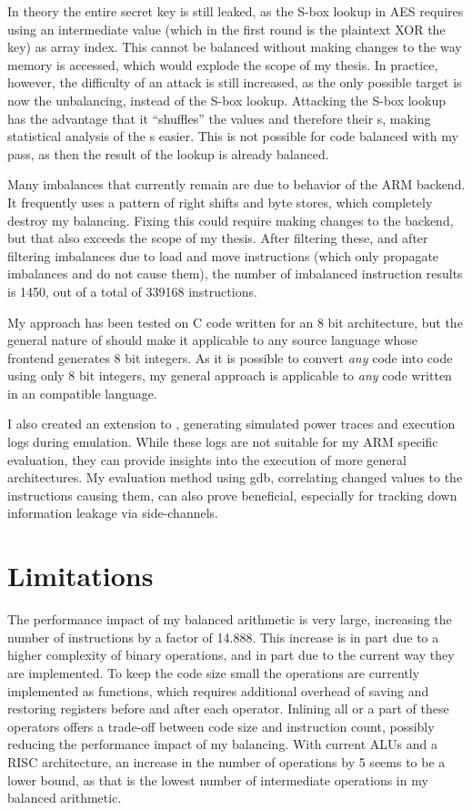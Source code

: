In theory the entire secret key is still leaked, as the S-box lookup in AES requires using an intermediate value (which in the first round is the plaintext XOR the key) as array index.
This cannot be balanced without making changes to the way memory is accessed, which would explode the scope of my thesis.
In practice, however, the difficulty of an attack is still increased, as the only possible target is now the unbalancing, instead of the S-box lookup.
Attacking the S-box lookup has the advantage that it ``shuffles'' the values and therefore their \hammingw{}s, making statistical analysis of the \hammingw{}s easier.
This is not possible for code balanced with my pass, as then the result of the lookup is already balanced.

Many imbalances that currently remain are due to behavior of the \llvm{} ARM backend.
It frequently uses a pattern of right shifts and byte stores, which completely destroy my balancing.
Fixing this could require making changes to the backend, but that also exceeds the scope of my thesis.
After filtering these, and after filtering imbalances due to load and move instructions (which only propagate imbalances and do not cause them), the number of imbalanced instruction results is 1450, out of a total of 339168 instructions.

My approach has been tested on C code written for an 8 bit architecture, but the general nature of \llvm{} should make it applicable to any source language whose frontend generates 8 bit integers.
As it is possible to convert \emph{any} code into code using only 8 bit integers, my general approach is applicable to \emph{any} code written in an \llvm{} compatible language.

I also created an extension to \qemu{}, generating simulated power traces and execution logs during emulation.
While these logs are not suitable for my ARM specific evaluation, they can provide insights into the execution of more general architectures.
My evaluation method using gdb, correlating changed values to the instructions causing them, can also prove beneficial, especially for tracking down information leakage via side-channels.

\section{Limitations}
The performance impact of my balanced arithmetic is very large, increasing the number of instructions by a factor of 14.888.
This increase is in part due to a higher complexity of binary operations, and in part due to the current way they are implemented.
To keep the code size small the operations are currently implemented as functions, which requires additional overhead of saving and restoring registers before and after each operator.
Inlining all or a part of these operators offers a trade-off between code size and instruction count, possibly reducing the performance impact of my balancing.
With current ALUs and a RISC architecture, an increase in the number of operations by 5 seems to be a lower bound, as that is the lowest number of intermediate operations in my balanced arithmetic.

